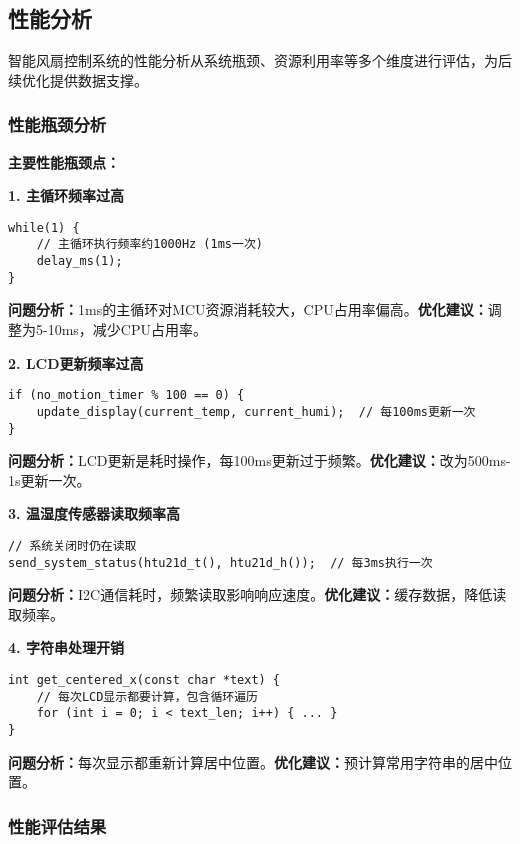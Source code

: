 \subsection{性能分析}

\qquad 智能风扇控制系统的性能分析从系统瓶颈、资源利用率等多个维度进行评估，为后续优化提供数据支撑。

\subsubsection{性能瓶颈分析}

\textbf{主要性能瓶颈点：}

\textbf{1. 主循环频率过高}
\begin{lstlisting}
while(1) {
    // 主循环执行频率约1000Hz (1ms一次)
    delay_ms(1);
}
\end{lstlisting}

\qquad \textbf{问题分析：}1ms的主循环对MCU资源消耗较大，CPU占用率偏高。\textbf{优化建议：}调整为5-10ms，减少CPU占用率。

\textbf{2. LCD更新频率过高}
\begin{lstlisting}
if (no_motion_timer % 100 == 0) {
    update_display(current_temp, current_humi);  // 每100ms更新一次
}
\end{lstlisting}

\qquad \textbf{问题分析：}LCD更新是耗时操作，每100ms更新过于频繁。\textbf{优化建议：}改为500ms-1s更新一次。

\textbf{3. 温湿度传感器读取频率高}
\begin{lstlisting}
// 系统关闭时仍在读取
send_system_status(htu21d_t(), htu21d_h());  // 每3ms执行一次
\end{lstlisting}

\qquad \textbf{问题分析：}I2C通信耗时，频繁读取影响响应速度。\textbf{优化建议：}缓存数据，降低读取频率。

\textbf{4. 字符串处理开销}
\begin{lstlisting}
int get_centered_x(const char *text) {
    // 每次LCD显示都要计算，包含循环遍历
    for (int i = 0; i < text_len; i++) { ... }
}
\end{lstlisting}

\qquad \textbf{问题分析：}每次显示都重新计算居中位置。\textbf{优化建议：}预计算常用字符串的居中位置。

\subsubsection{性能评估结果}

